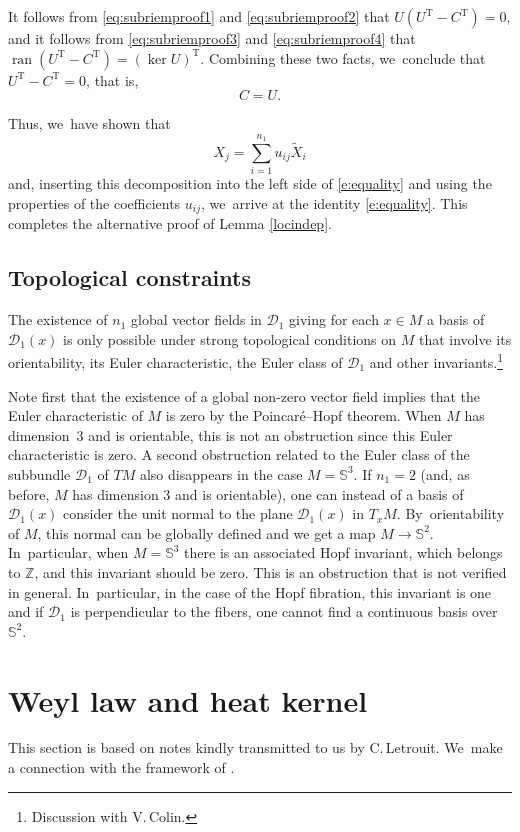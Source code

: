 \documentclass[11pt]{article}
\theoremstyle{definition}
\newcommand{\1}{\mathbbm{1}}
\newcommand{\Sph}{\mathbb{S}}
\DeclareMathOperator{\ran}{ran}
\numberwithin{equation}{section}
\begin{document}
It follows from \eqref{eq:subriemproof1} and \eqref{eq:subriemproof2} that $U(U^\mathrm{T} - C^\mathrm{T}) = 0$, and it follows from \eqref{eq:subriemproof3} and \eqref{eq:subriemproof4} that $\ran(U^\mathrm{T} - C^\mathrm{T}) = (\ker U)^\mathrm{T}$. Combining these two facts, we~conclude that $U^\mathrm{T} - C^\mathrm{T}=0$, that is,
\[
C = U.
\]

Thus, we~have shown that
\[
X_j = \sum_{i=1}^{n_1} u_{ij} \tilde X_i
\]
and, inserting this decomposition into the left side of \eqref{e:equality} and using the properties of the coefficients $u_{ij}$, we~arrive at the identity \eqref{e:equality}. This completes the alternative proof of Lemma \ref{locindep}.

\subsection{Topological constraints}\label{ssA.4}
The existence of $n_1$ global vector fields in $\mathcal D_1$ giving for each
$x\in M$ a basis of $\mathcal D_1(x)$ is only possible under strong topological conditions on $M$ that involve its orientability, its Euler characteristic, the Euler class of $\mathcal D_1$ and other invariants.\footnote{Discussion with V.\,Colin.}

Note first that the existence of a global non-zero vector field implies that the Euler characteristic of $M$ is zero by the Poincaré--Hopf theorem.
When $M$ has dimension~3 and is orientable, this is not an obstruction since this Euler characteristic is zero. A second obstruction related to the Euler class of the subbundle $\mathcal D_1$ of $TM$ also disappears in the case $M=\mathbb S^3$. If $n_1=2$ (and, as before, $M$ has dimension 3 and is orientable), one can instead of a basis of $\mathcal D_1(x)$ consider the unit normal to the plane $\mathcal D_1(x)$ in $T_x M$. By~orientability of $M$, this normal can be globally defined and we get a map $M \to \Sph^2$. In~particular, when $M=\mathbb S^3$ there is an associated Hopf invariant, which belongs to $\mathbb Z$, and this invariant should be zero. This is an obstruction that is not verified in general. In~particular, in the case of the Hopf fibration, this invariant is one and if $\mathcal D_1$ is perpendicular to the fibers, one cannot find a continuous basis over~$\mathbb S^2$.

\section{Weyl law and heat kernel}\label{AppC}
This section is based on notes kindly transmitted to us by C.\,Letrouit. We~make a connection with the framework of \cite{CHT1}.
\end{document}
